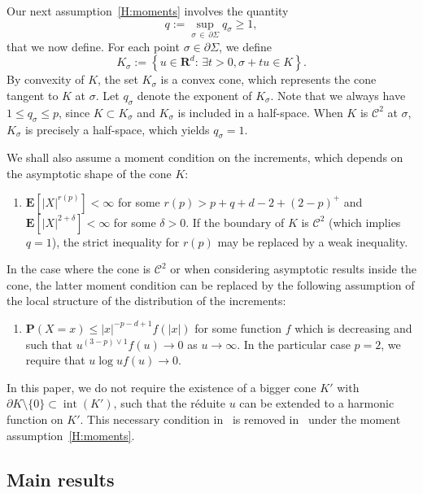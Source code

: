 \documentclass[10pt]{amsart}
\theoremstyle{definition}\newtheorem{defi}[theo]{Definition}\newtheorem{rema}[theo]{Remark}\newtheorem{exam}[theo]{Example}\newtheorem{exem}[theo]{Example}\newtheorem{nota}[theo]{Notation}
\DeclareMathOperator{\intl}{int}
\newcommand{\clC}{\mathcal{C}}
\newcommand{\pr}{\mathbf{P}}
\newcommand{\e}{\mathbf{E}}
\newcommand{\bfR}{\mathbf{R}}
\renewcommand{\le}{\leqslant}
\renewcommand{\leq}{\leqslant}
\renewcommand{\geq}{\geqslant}
\newcommand*{\relabel}{\renewcommand{\labelenumi}{(\theenumi)}}
\newcommand*{\Menumi}{\renewcommand*{\theenumi}{M\arabic{enumi}}\relabel}
\let\oldexists\exists
\renewcommand*{\exists}{\mathrel{\oldexists}}
\begin{document}
Our next assumption~\eqref{H:moments} involves the quantity
\[
q:=\sup_{\sigma\,\in\,\partial\Sigma}q_{\sigma}\geq 1,
\]
that we now define. For each point $\sigma\in\partial\Sigma$, we define
\begin{equation}\label{eq:def_K_sigma}
K_{\sigma}:=\left\{ u\in\bfR^d:\,\exists t>0, \sigma+tu\in K\right\}.
\end{equation}
By convexity of $K$, the set $K_{\sigma}$ is a convex cone, which represents the cone tangent to $K$ at $\sigma$. Let $q_{\sigma}$ denote the exponent of $K_{\sigma}$. Note that we always have $1\leq q_{\sigma}\leq p$, since $K\subset K_{\sigma}$ and $K_{\sigma}$ is included in a half-space. When $K$ is $\clC^{2}$ at $\sigma$, $K_{\sigma}$ is precisely a half-space, which yields $q_{\sigma}=1$.

We shall also assume a moment condition on the increments, which depends on the asymptotic shape of the cone $K$:
\begin{enumerate}\Menumi
\setcounter{enumi}{0}
\item\label{H:moments}
$\e[| X|^{r(p)}]<\infty$ for some $r(p)>p+q+d-2+(2-p)^{+}$ and $\e[| X|^{2+\delta}]<\infty$ for some $\delta>0$. If the boundary of $K$ is $\clC^{2}$ (which implies $q=1$), the strict inequality for $r(p)$ may be replaced by a weak inequality.
\end{enumerate}
In the case where the cone is $\clC^{2}$ or when considering asymptotic results inside the cone, the latter moment condition can be replaced by the following assumption of the local structure of the distribution of the increments:
\begin{enumerate}\Menumi
\setcounter{enumi}{1}
\item\label{local_assump}
$\pr(X=x)\le | x|^{-p-d+1}f(| x|)$ for some function $f$ which is decreasing and such that $u^{(3-p)\vee 1}f(u)\to 0$ as $u\to\infty$. In the particular case $p=2$, we require that $u\log uf(u)\to0$.
\end{enumerate}

In this paper, we do not require the existence of a bigger cone $K'$ with $\partial K\setminus\{ 0\}\subset \intl(K')$, such that the réduite $u$ can be extended to a harmonic function on $K'$. This necessary condition in~\cite{DeWa-15} is removed in~\cite{DeWa-19} under the moment assumption~\eqref{H:moments}.



\subsection*{Main results}
\end{document}
